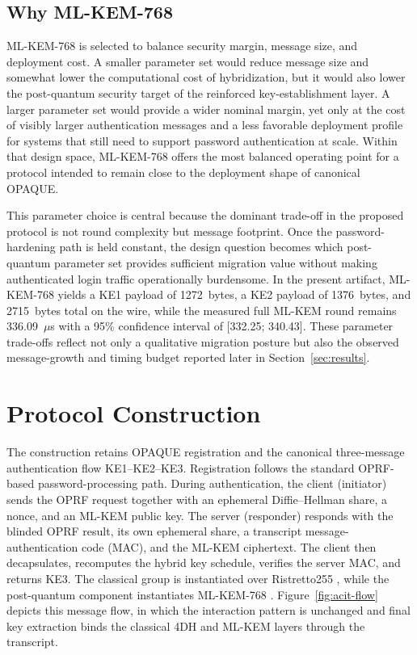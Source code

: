 \documentclass[conference]{IEEEtran}
\begin{document}
\subsection{Why ML-KEM-768}

ML-KEM-768 is selected to balance security margin, message size, and deployment cost. A smaller parameter set would reduce message size and somewhat lower the computational cost of hybridization, but it would also lower the post-quantum security target of the reinforced key-establishment layer. A larger parameter set would provide a wider nominal margin, yet only at the cost of visibly larger authentication messages and a less favorable deployment profile for systems that still need to support password authentication at scale. Within that design space, ML-KEM-768 offers the most balanced operating point for a protocol intended to remain close to the deployment shape of canonical OPAQUE.


This parameter choice is central because the dominant trade-off in the proposed protocol is not round complexity but message footprint. Once the password-hardening path is held constant, the design question becomes which post-quantum parameter set provides sufficient migration value without making authenticated login traffic operationally burdensome. In the present artifact, ML-KEM-768 yields a KE1 payload of 1272~bytes, a KE2 payload of 1376~bytes, and 2715~bytes total on the wire, while the measured full ML-KEM round remains 336.09~$\mu$s with a 95\% confidence interval of [332.25; 340.43]. These parameter trade-offs reflect not only a qualitative migration posture but also the observed message-growth and timing budget reported later in Section~\ref{sec:results}.

\section{Protocol Construction}

The construction retains OPAQUE registration and the canonical three-message authentication flow KE1--KE2--KE3. Registration follows the standard OPRF-based password-processing path. During authentication, the client (initiator) sends the OPRF request together with an ephemeral Diffie--Hellman share, a nonce, and an ML-KEM public key. The server (responder) responds with the blinded OPRF result, its own ephemeral share, a transcript message-authentication code (MAC), and the ML-KEM ciphertext. The client then decapsulates, recomputes the hybrid key schedule, verifies the server MAC, and returns KE3. The classical group is instantiated over Ristretto255 \cite{devalence2024}, while the post-quantum component instantiates ML-KEM-768 \cite{fips203}. Figure~\ref{fig:acit-flow} depicts this message flow, in which the interaction pattern is unchanged and final key extraction binds the classical 4DH and ML-KEM layers through the transcript.
\end{document}
